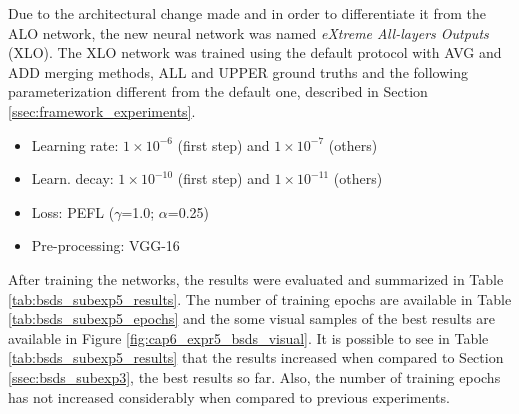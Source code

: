 Due to the architectural change made and in order to differentiate it from the ALO network, the new neural network was named \textit{eXtreme All-layers Outputs}  (XLO).
The XLO network was trained using the default protocol with AVG and ADD merging methods, ALL and UPPER ground truths and the following parameterization different from the default one, described in Section \ref{ssec:framework_experiments}.

\begin{itemize}
  \item Learning rate: $1 \times 10^{-6}$ (first step) and $1 \times 10^{-7}$ (others)
  \item Learn. decay: $1 \times 10^{-10}$ (first step) and $1 \times 10^{-11}$ (others)
  \item Loss: PEFL ($\gamma$=1.0; $\alpha$=0.25)
  \item Pre-processing: VGG-16
\end{itemize}


After training the networks, the results were evaluated and summarized in Table \ref{tab:bsds_subexp5_results}.
The number of training epochs are available in Table \ref{tab:bsds_subexp5_epochs} and the some visual samples of the best results are available in Figure \ref{fig:cap6_expr5_bsds_visual}.
It is possible to see in Table \ref{tab:bsds_subexp5_results} that the results increased when compared to Section \ref{ssec:bsds_subexp3}, the best results so far.
Also, the number of training epochs has not increased considerably when compared to previous experiments.

